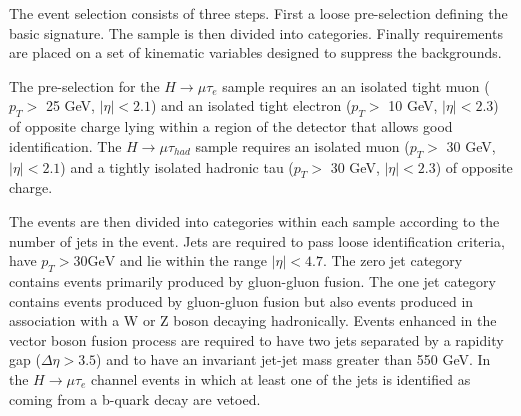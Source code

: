 The event selection consists of three steps. First  a loose pre-selection defining the basic signature. The sample is then divided into categories.
Finally requirements are placed on  a set of kinematic variables designed to suppress the backgrounds.


The pre-selection for the  $H \rightarrow \mu \tau_{e}$  sample requires an an isolated tight muon
($p_{T} >$ 25 GeV, $|\eta| <2.1$) and an  isolated tight electron ($p_{T} >$ 10 GeV, $|\eta| <2.3$)  of opposite charge lying within a region of the detector that allows good identification. The
$H \rightarrow \mu \tau_{had}$ sample requires an isolated muon ($p_{T} >$ 30 GeV, $|\eta| <2.1$) and a tightly isolated  hadronic tau ($p_{T} >$ 30 GeV, $|\eta| <2.3$) of opposite charge.

The events are then divided into categories within each sample according to the number of jets in the
event. Jets are required to pass loose identification criteria, have $p_{T}> 30 \mathrm{GeV}$ and
lie within the range $|\eta| < 4.7$. The zero jet category contains events primarily produced by gluon-gluon fusion.
The one jet category contains events produced by gluon-gluon fusion but also events produced in association with
a W or Z boson decaying hadronically. Events enhanced in  the vector boson fusion
process are required to have two jets separated by a rapidity gap ($\Delta \eta > 3.5$)  and to have an invariant
jet-jet mass greater than 550 GeV. In the $H \rightarrow \mu \tau_{e}$ channel events in which at least one of the jets is identified
as coming from a b-quark decay are vetoed.

